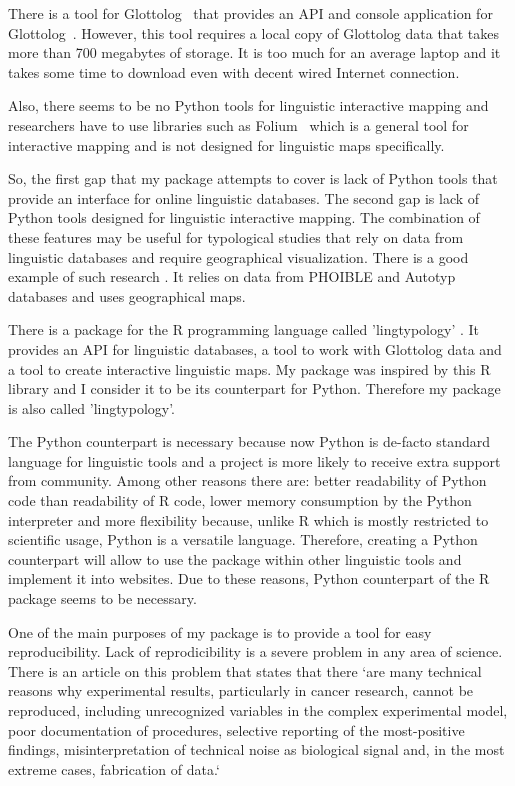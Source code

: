 \documentclass[a4paper,12pt]{article}
\begin{document}
There is a tool for Glottolog~\parencite{HaraldHammarstrom2019} that provides an API and console application for Glottolog~\parencite{Robert2Forkel2019}. However, this tool requires a local copy of Glottolog data that takes more than 700 megabytes of storage. It is too much for an average laptop and it takes some time to download even with decent wired Internet connection.

Also, there seems to be no Python tools for linguistic interactive mapping and researchers have to use libraries such as Folium~\parencite{folium} which is a general tool for interactive mapping and is not designed for linguistic maps specifically.

So, the first gap that my package attempts to cover is lack of Python tools that provide an interface for online linguistic databases. The second gap is lack of Python tools designed for linguistic interactive mapping. The combination of these features may be useful for typological studies that rely on data from linguistic databases and require geographical visualization. There is a good example of such research \parencite{Blasieaav3218}. It relies on data from PHOIBLE \parencite{phoible} and Autotyp \parencite{autotyp} databases and uses geographical maps.

There is a package for the R programming language called 'lingtypology' \parencite{GeorgeMoroz2018}. It provides an API for linguistic databases, a tool to work with Glottolog data and a tool to create interactive linguistic maps. My package was inspired by this R library and I consider it to be its counterpart for Python. Therefore my package is also called 'lingtypology'. 

The Python counterpart is necessary because now Python is de-facto standard language for linguistic tools and a project is more likely to receive extra support from community. Among other reasons there are: better readability of Python code than readability of R code, lower memory consumption by the Python interpreter and more flexibility because, unlike R which is mostly restricted to scientific usage, Python is a versatile language. Therefore, creating a Python counterpart will allow to use the package within other linguistic tools and implement it into websites. Due to these reasons, Python counterpart of the R package seems to be necessary.

One of the main purposes of my package is to provide a tool for easy reproducibility. Lack of reprodicibility is a severe problem in any area of science. There is an article on this problem that states that there `are many technical reasons why experimental results, particularly in cancer research, cannot be reproduced, including unrecognized variables in the complex experimental model, 
poor documentation of procedures, selective reporting of the most-positive findings, 
misinterpretation of technical noise as biological signal and, in the most extreme 
cases, fabrication of data.`~\parencite{Pusztai2013}
\end{document}
